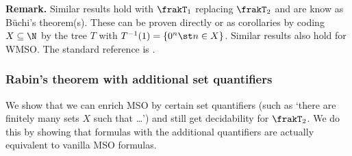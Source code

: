 {\bf Remark.} Similar results hold with $\frakT_1$ replacing $\frakT_2$ and are know as B\"uchi's theorem(s). 
These can be proven directly  or as corollaries by coding $X \subseteq \N$ by the tree $T$ with $T^{-1}(1) = \{0^n \st n \in X\}$.
Similar results also hold for WMSO. The standard reference is \cite{Thom90}.
%
\subsubsection*{Rabin's theorem with additional set quantifiers} \label{AS:sec:beyond}

We show that we can enrich MSO by certain set quantifiers (such as `there are finitely many sets $X$ such that \dots')
and still get decidability  for $\frakT_2$. We do this by showing that formulas with the additional quantifiers are actually equivalent to vanilla MSO formulas. 





